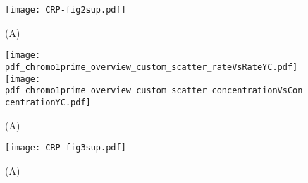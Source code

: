 \begin{figure}
	\centering
	\texttt{[image: CRP-fig2sup.pdf]}
	\caption{ 
		(A) 
	}
	\label{fig:CRP:fig2}
\end{figure}

\begin{figure}
	\centering
	\texttt{[image: pdf\_chromo1prime\_overview\_custom\_scatter\_rateVsRateYC.pdf]}
	\texttt{[image: pdf\_chromo1prime\_overview\_custom\_scatter\_concentrationVsConcentrationYC.pdf]}
	\caption{ 
		(A) 
	}
	\label{fig:CRP:fig3}
\end{figure}


\begin{figure}
	\centering
	\texttt{[image: CRP-fig3sup.pdf]}
	\caption{ 
		(A) 
	}
	\label{fig:CRP:fig3}
\end{figure}




